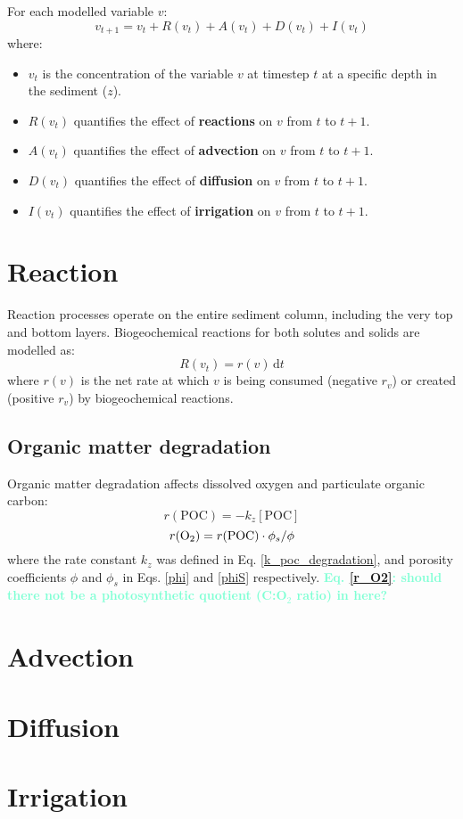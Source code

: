 \documentclass[a4paper]{article}
\newcommand{\D}[1]{\mathrm{d}#1}
\newcommand{\wtf}[1]{\textcolor{Aquamarine}{\textbf{#1}}}
\begin{document}
For each modelled variable $v$:
\begin{equation}
v_{t+1} = v_t + R(v_t) + A(v_t) + D(v_t) + I(v_t)
\end{equation}
where:
\begin{itemize}
  \item $v_t$ is the concentration of the variable $v$ at timestep $t$ at a specific depth in the sediment ($z$).
  \item $R(v_t)$ quantifies the effect of \textbf{reactions} on $v$ from $t$ to $t+1$.
  \item $A(v_t)$ quantifies the effect of \textbf{advection} on $v$ from $t$ to $t+1$.
  \item $D(v_t)$ quantifies the effect of \textbf{diffusion} on $v$ from $t$ to $t+1$.
  \item $I(v_t)$ quantifies the effect of \textbf{irrigation} on $v$ from $t$ to $t+1$.
\end{itemize}

\section{Reaction}

Reaction processes operate on the entire sediment column, including the very top and bottom layers. Biogeochemical reactions for both solutes and solids are modelled as:
\begin{equation}
R(v_t) = r(v) \, \D{t}
\end{equation}
where $r(v)$ is the net rate at which $v$ is being consumed (negative $r_v$) or created (positive $r_v$) by biogeochemical reactions.

\subsection{Organic matter degradation}

Organic matter degradation affects dissolved oxygen and particulate organic carbon:
\begin{equation}
r(\mathrm{POC}) = -k_z [\mathrm{POC}]
\end{equation}
\begin{equation}\label{r_O2}
r(\ce{O2}) = r(\mathrm{POC}) \cdot \phi_s / \phi
\end{equation}
where the rate constant $k_z$ was defined in Eq. \eqref{k_poc_degradation}, and porosity coefficients $\phi$ and $\phi_s$ in Eqs. \eqref{phi} and \eqref{phiS} respectively. \wtf{Eq. \eqref{r_O2}: should there not be a photosynthetic quotient (C:O$_2$ ratio) in here?}

\section{Advection}

\section{Diffusion}

\section{Irrigation}


\end{document}
